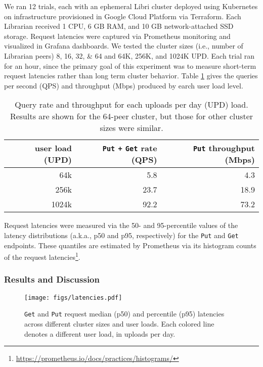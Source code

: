 \documentclass[10pt]{article}
\newcommand{\ttt}[1]{\texttt{#1}}
\def\Put{\ttt{Put}}
\def\Get{\ttt{Get}}
\begin{document}
We ran 12 trials, each with an ephemeral Libri cluster deployed using Kubernetes on infrastructure provisioned in Google Cloud Platform via Terraform. Each Librarian received 1 CPU, 6 GB RAM, and 10 GB network-attached SSD storage. Request latencies were captured via Prometheus monitoring and visualized in Grafana dashboards. We tested the cluster sizes (i.e., number of Librarian peers) 8, 16, 32, \& 64 and 64K, 256K, and 1024K UPD. Each trial ran for an hour, since the primary goal of this experiment was to measure short-term request latencies rather than long term cluster behavior. Table \ref{tbl:updload} gives the queries per second (QPS) and throughput (Mbps) produced by earch user load level. 

\begin{table}[t]
\centering
\begin{tabular}{rrr}
	\toprule
	user load (UPD) & \Put{} \ttt{+} \Get{} rate (QPS) & \Put{} throughput (Mbps) \\ \midrule
	64k & 5.8 & 4.3 \\
	256k & 23.7 & 18.9 \\
	1024k & 92.2 & 73.2 \\ \bottomrule
\end{tabular}
\caption{Query rate and throughput for each uploads per day (UPD) load. Results are shown for the 64-peer cluster, but those for other cluster sizes were similar.}
\label{tbl:updload}
\end{table}

Request latencies were measured via the 50- and 95-percentile values of the latency distributions (a.k.a., p50 and p95, respectively) for the \ttt{Put} and \texttt{Get} endpoints. These quantiles are estimated by Prometheus via its histogram counts of the request latencies\footnote{\url{https://prometheus.io/docs/practices/histograms/}}.  

\subsubsection{Results and Discussion}

\begin{figure}[t]
	\centering
	\texttt{[image: figs/latencies.pdf]}
	\caption{\Get{} and \Put{} request median (p50) and  percentile (p95) latencies across different cluster sizes and user loads. Each colored line denotes a different user load, in uploads per day.}
	\label{fig:latencies}
\end{figure}
\end{document}
